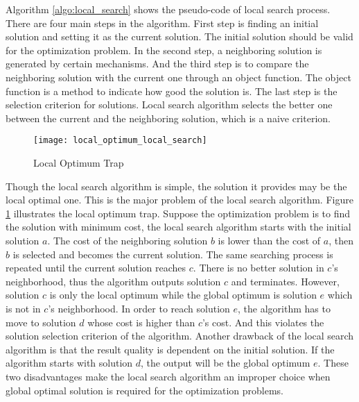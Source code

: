 		Algorithm \ref{algo:local_search} shows the pseudo-code of local search
		process. There are four main steps in the algorithm. First step is
		finding an initial solution and setting it as the current solution.
		The initial solution should be valid for the optimization problem.
		In the second step, a neighboring solution is generated by certain
		mechanisms. And the third step is to compare the neighboring solution
		with the current one through an object function. The object function is
		a method to indicate how good the solution is. The last step is the
		selection criterion for solutions. Local search algorithm selects the
		better one between the current and the neighboring solution, which is a
		naive criterion.
			\begin{figure}[htb]
				\begin{center}
					\texttt{[image: local\_optimum\_local\_search]}
					\caption[Local Optimum Trap]{Local Optimum Trap}
					\label{fig:local_optimum_local_search}
				\end{center}
			\end{figure}
		
		Though the local search algorithm is simple, the solution it provides may
		be the local optimal one. This is the major problem of the local search algorithm.
		Figure \ref{fig:local_optimum_local_search} illustrates the local optimum trap.
		Suppose the optimization problem is to find the solution with minimum cost,
		the local search algorithm starts with the initial solution $a$.
		The cost of the neighboring solution $b$ is lower than the cost of $a$,
		then $b$ is selected and becomes the current solution. The same searching process 
		is repeated until the current solution reaches $c$. There is no better solution
		in $c$'s neighborhood, thus the algorithm outputs solution $c$ and terminates.
		However, solution $c$ is only the local optimum while the global optimum is
		solution $e$ which is not in $c$'s neighborhood. In order to reach solution $e$,
		the algorithm has to move to solution $d$ whose cost is higher than $c$'s cost.
		And this violates the solution selection criterion of the algorithm.
		Another drawback of the local search algorithm is that the result quality is
		dependent on the initial solution. If the algorithm starts with solution $d$,
		the output will be the global optimum $e$. These two disadvantages make the local
		search algorithm an improper choice when global optimal solution is required for 
		the optimization problems.
				
